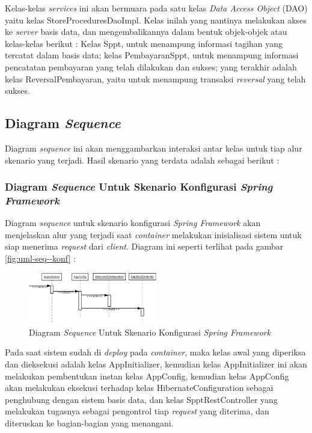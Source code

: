 \documentclass[pdftex,12pt, oneside]{article}
\begin{document}
Kelas-kelas \textit{services} ini akan bermuara pada satu kelas \textit{Data Access Object} (DAO) yaitu kelas StoreProceduresDaoImpl. Kelas inilah yang nantinya melakukan akses ke \textit{server} basis data, dan mengembalikannya dalam bentuk objek-objek atau kelas-kelas berikut : Kelas Sppt, untuk menampung informasi tagihan yang tercatat dalam basis data; kelas PembayaranSppt, untuk menampung informasi pencatatan pembayaran yang telah dilakukan dan sukses; yang terakhir adalah kelas ReversalPembayaran, yaitu untuk menampung transaksi \textit{reversal} yang telah sukses.

\subsection{Diagram \textit{Sequence}}

Diagram \textit{sequence} ini akan menggambarkan interaksi antar kelas untuk tiap alur skenario yang terjadi. Hasil skenario yang terdata adalah sebagai berikut :

\subsubsection{Diagram \textit{Sequence} Untuk Skenario Konfigurasi \textit{Spring Framework}}

Diagram \textit{sequence} untuk skenario konfigurasi \textit{Spring Framework} akan menjelaskan alur yang terjadi saat \textit{container} melakukan inisialisasi sistem untuk siap menerima \textit{request} dari \textit{client}. Diagram ini seperti terlihat pada gambar \ref{fig:uml-seq--konf} :

\begin{figure}[H]
  \centering
  \includegraphics[width=0.5\textwidth]{./resources/uml/uml-seq-konf}
  \caption{Diagram \textit{Sequence} Untuk Skenario Konfigurasi \textit{Spring Framework}}
  \label{fig:uml-seq-konf}
\end{figure}

Pada saat sistem sudah di \textit{deploy} pada \textit{container}, maka kelas awal yang diperiksa dan dieksekusi adalah kelas AppInitializer, kemudian kelas AppInitializer ini akan melakukan pembentukan instan kelas AppConfig, kemudian kelas AppConfig akan melakukan eksekusi terhadap kelas HibernateConfiguration sebagai penghubung dengan sistem basis data, dan kelas SpptRestController yang melakukan tugasnya sebagai pengontrol tiap \textit{request} yang diterima, dan diteruskan ke bagian-bagian yang menangani.
\end{document}
